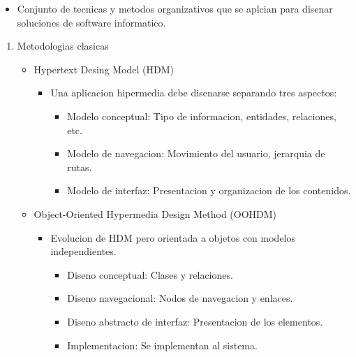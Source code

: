 \documentclass[11pt]{article}
\begin{document}
\begin{enumerate}
\label{sec:orgbc23d0f}
\begin{itemize}
\item Conjunto de tecnicas y metodos organizativos que se aplcian para disenar soluciones de software informatico.
\end{itemize}
\begin{enumerate}
\item Metodologias clasicas
\label{sec:org93bf14b}
\begin{itemize}
\item Hypertext Desing Model (HDM)
\begin{itemize}
\item Una aplicacion hipermedia debe disenarse separando tres aspectos:
\begin{itemize}
\item Modelo conceptual: Tipo de informacion, entidades, relaciones, etc.
\item Modelo de navegacion: Movimiento del usuario, jerarquia de rutas.
\item Modelo de interfaz: Presentacion y organizacion de los contenidos.
\end{itemize}
\end{itemize}

\item Object-Oriented Hypermedia Design Method (OOHDM)
\begin{itemize}
\item Evolucion de HDM pero orientada a objetos con modelos independientes.
\begin{itemize}
\item Diseno conceptual: Clases y relaciones.
\item Diseno navegacional: Nodos de navegacion y enlaces.
\item Diseno abstracto de interfaz: Presentacion de los elementos.
\item Implementacion: Se implementan al sistema.
\end{itemize}
\end{itemize}


\end{itemize}
\end{enumerate}
\end{enumerate}
\end{document}
